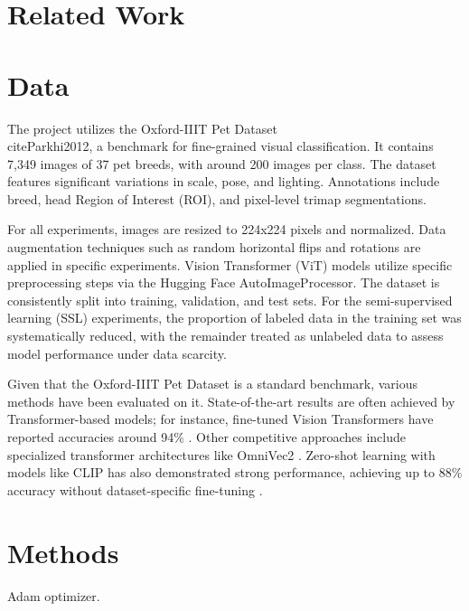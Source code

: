 \documentclass{article}
\begin{document}
\section{Related Work}


\section{Data}
The project utilizes the Oxford-IIIT Pet Dataset \\cite{Parkhi2012}, a benchmark for fine-grained visual classification. It contains 7,349 images of 37 pet breeds, with around 200 images per class. The dataset features significant variations in scale, pose, and lighting. Annotations include breed, head Region of Interest (ROI), and pixel-level trimap segmentations.

For all experiments, images are resized to 224x224 pixels and normalized. Data augmentation techniques such as random horizontal flips and rotations are applied in specific experiments. Vision Transformer (ViT) models utilize specific preprocessing steps via the Hugging Face AutoImageProcessor. The dataset is consistently split into training, validation, and test sets. For the semi-supervised learning (SSL) experiments, the proportion of labeled data in the training set was systematically reduced, with the remainder treated as unlabeled data to assess model performance under data scarcity.

Given that the Oxford-IIIT Pet Dataset is a standard benchmark, various methods have been evaluated on it. State-of-the-art results are often achieved by Transformer-based models; for instance, fine-tuned Vision Transformers have reported accuracies around 94\% \cite{HFNorburayViTPets}. Other competitive approaches include specialized transformer architectures like OmniVec2 \cite{Srivastava2024OmniVec2}. Zero-shot learning with models like CLIP has also demonstrated strong performance, achieving up to 88\% accuracy without dataset-specific fine-tuning \cite{HFMuellje3ViTPets}.



\section{Methods}
Adam optimizer.
\end{document}
